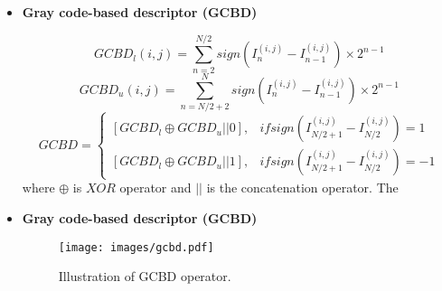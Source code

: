 \begin{frame}[t]{\subsubsecname}
	\topline
    \begin{itemize}
    	\item \textcolor{navy_theme}{\textbf{Gray code-based descriptor (GCBD) \cite{Zhao2008gcbd}}}
				
		\begin{equation}\label{eq20}
			GCBD_{l}(i,j)=\sum_{n=2}^{N/2}sign(I_{n}^{(i,j)}-I_{n-1}^{(i,j)})\times 2^{n-1}
		\end{equation}
		\begin{equation}\label{eq21}
			GCBD_{u}(i,j)=\sum_{n=N/2+2}^{N}sign(I_{n}^{(i,j)}-I_{n-1}^{(i,j)})\times 2^{n-1}
		\end{equation}
		\begin{equation}\label{eq22}
			GCBD=
			\left\{\begin{matrix}
				[GCBD_{l} \oplus  GCBD_{u} || 0] , & if sign(I_{N/2+1}^{(i,j)}-I_{N/2}^{(i,j)})=1   \\
				[GCBD_{l} \oplus  GCBD_{u} || 1],  & if  sign(I_{N/2+1}^{(i,j)}-I_{N/2}^{(i,j)})=-1
			\end{matrix}\right.
		\end{equation}
		where $\oplus$ is $XOR$ operator and $||$ is the concatenation operator. The
	\end{itemize}
\end{frame}

\begin{frame}[t]{\subsubsecname}
	\topline
    \begin{itemize}
    	\item \textcolor{navy_theme}{\textbf{ Gray code-based descriptor (GCBD) \cite{Zhao2008gcbd}}}
    	\vspace{1em}
		\begin{figure}[!ht]
			\centering
			\texttt{[image: images/gcbd.pdf]}
			\caption{Illustration of GCBD operator.}
			\label{GCBD1}
			\vspace{-6mm}
		\end{figure}
		
	\end{itemize}
\end{frame}

